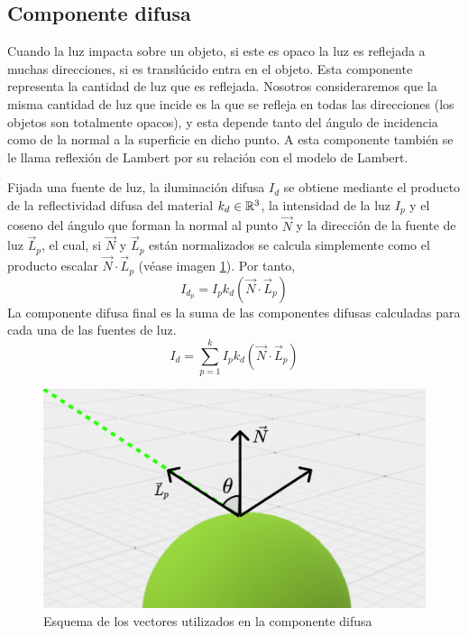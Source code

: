 \subsection{Componente difusa}

Cuando la luz impacta sobre un objeto, si este es opaco la luz es reflejada a muchas direcciones, si es translúcido entra en el objeto. Esta componente representa la cantidad de luz que es reflejada. Nosotros consideraremos que la misma cantidad de luz que incide es la que se refleja en todas las direcciones (los objetos son totalmente opacos), y esta depende tanto del ángulo de incidencia como de la normal a la superficie en dicho punto. A esta componente también se le llama reflexión de Lambert por su relación con el modelo de Lambert.

Fijada una fuente de luz, la iluminación difusa $I_d$ se obtiene mediante el producto de la reflectividad difusa del material $k_d\in\mathbb{R}^3$, la intensidad de la luz $I_p$ y el coseno del ángulo que forman la normal al punto $\vec N$ y la dirección de la fuente de luz $\vec L_p$, el cual, si $\vec N$ y $\vec L_p$ están normalizados se calcula simplemente como el producto escalar $\vec N\cdot \vec L_p$ (véase imagen \ref{fig:difusa}). Por tanto,
\begin{equation}
    I_{d_p} = I_p k_d (\vec N\cdot \vec L_p)
\end{equation}
La componente difusa final es la suma de las componentes difusas calculadas para cada una de las fuentes de luz.
\begin{equation}
    I_d = \sum_{p=1}^k I_p k_d (\vec N\cdot \vec L_p)
\end{equation}

\begin{figure} [ht]
    \centering
    \includegraphics[scale = 0.25]{img/C7/difusa.png}
    \caption{Esquema de los vectores utilizados en la componente difusa}
    \label{fig:difusa}
\end{figure}

